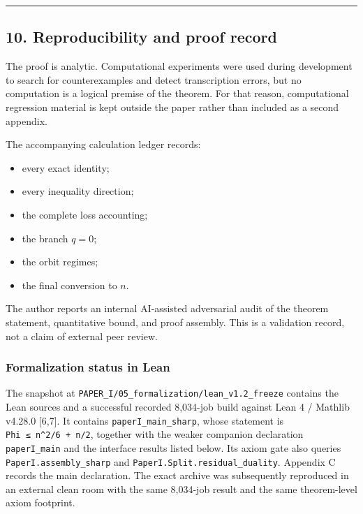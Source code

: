 \documentclass[
  american,
  11pt,
  a4paper,
]{article}
\providecommand{\tightlist}{%
  \setlength{\itemsep}{0pt}\setlength{\parskip}{0pt}}
\begin{document}
\begin{center}\rule{0.5\linewidth}{0.5pt}\end{center}

\subsection{10. Reproducibility and proof record}\label{reproducibility-and-proof-record}

The proof is analytic. Computational experiments were used during development to search for counterexamples and detect transcription errors, but no computation is a logical premise of the theorem. For that reason, computational regression material is kept outside the paper rather than included as a second appendix.

The accompanying calculation ledger records:

\begin{itemize}
\tightlist
\item
  every exact identity;
\item
  every inequality direction;
\item
  the complete loss accounting;
\item
  the branch \(q=0\);
\item
  the orbit regimes;
\item
  the final conversion to \(n\).
\end{itemize}

The author reports an internal AI-assisted adversarial audit of the theorem statement, quantitative bound, and proof assembly. This is a validation record, not a claim of external peer review.

\subsubsection{Formalization status in Lean}\label{formalization-status-in-lean}

The snapshot at \texttt{PAPER\_I/05\_formalization/lean\_v1.2\_freeze} contains the Lean sources and a successful recorded 8,034-job build against Lean 4 / Mathlib v4.28.0 {[}6,7{]}. It contains \texttt{paperI\_main\_sharp}, whose statement is \texttt{Phi\ ≤\ n\^{}2/6\ +\ n/2}, together with the weaker companion declaration \texttt{paperI\_main} and the interface results listed below. Its axiom gate also queries \texttt{PaperI.assembly\_sharp} and \texttt{PaperI.Split.residual\_duality}. Appendix C records the main declaration. The exact archive was subsequently reproduced in an external clean room with the same 8,034-job result and the same theorem-level axiom footprint.
\end{document}
